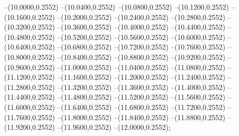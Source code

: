 {	--(10.0000,0.2552)
	--(10.0400,0.2552)
	--(10.0800,0.2552)
	--(10.1200,0.2552)
	--(10.1600,0.2552)
	--(10.2000,0.2552)
	--(10.2400,0.2552)
	--(10.2800,0.2552)
	--(10.3200,0.2552)
	--(10.3600,0.2552)
	--(10.4000,0.2552)
	--(10.4400,0.2552)
	--(10.4800,0.2552)
	--(10.5200,0.2552)
	--(10.5600,0.2552)
	--(10.6000,0.2552)
	--(10.6400,0.2552)
	--(10.6800,0.2552)
	--(10.7200,0.2552)
	--(10.7600,0.2552)
	--(10.8000,0.2552)
	--(10.8400,0.2552)
	--(10.8800,0.2552)
	--(10.9200,0.2552)
	--(10.9600,0.2552)
	--(11.0000,0.2552)
	--(11.0400,0.2552)
	--(11.0800,0.2552)
	--(11.1200,0.2552)
	--(11.1600,0.2552)
	--(11.2000,0.2552)
	--(11.2400,0.2552)
	--(11.2800,0.2552)
	--(11.3200,0.2552)
	--(11.3600,0.2552)
	--(11.4000,0.2552)
	--(11.4400,0.2552)
	--(11.4800,0.2552)
	--(11.5200,0.2552)
	--(11.5600,0.2552)
	--(11.6000,0.2552)
	--(11.6400,0.2552)
	--(11.6800,0.2552)
	--(11.7200,0.2552)
	--(11.7600,0.2552)
	--(11.8000,0.2552)
	--(11.8400,0.2552)
	--(11.8800,0.2552)
	--(11.9200,0.2552)
	--(11.9600,0.2552)
	--(12.0000,0.2552);
}
